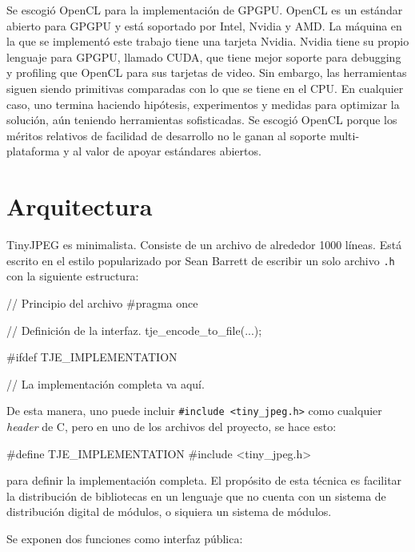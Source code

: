 Se escogió OpenCL para la implementación de GPGPU. OpenCL es un estándar abierto
para GPGPU y está soportado por Intel, Nvidia y AMD. La máquina en la que se
implementó este trabajo tiene una tarjeta Nvidia. Nvidia tiene su propio
lenguaje para GPGPU, llamado CUDA, que tiene mejor soporte para debugging y
profiling que OpenCL para sus tarjetas de video. Sin embargo, las herramientas
siguen siendo primitivas comparadas con lo que se tiene en el CPU. En cualquier
caso, uno termina haciendo hipótesis, experimentos y medidas para optimizar la
solución, aún teniendo herramientas sofisticadas. Se escogió OpenCL porque los
méritos relativos de facilidad de desarrollo no le ganan al soporte
multi-plataforma y al valor de apoyar estándares abiertos.

\section{Arquitectura}

TinyJPEG es minimalista. Consiste de un archivo de alrededor 1000 líneas. Está
escrito en el estilo popularizado por Sean Barrett de escribir un solo archivo
\verb+.h+ con la siguiente estructura:

\label{alg:stb}
\begin{code}[language=C][h]
    // Principio del archivo
    #pragma once

    // Definición de la interfaz.
    tje_encode_to_file(...);

    #ifdef TJE_IMPLEMENTATION

    // La implementación completa va aquí.
\end{code}

De esta manera, uno puede incluir \verb+#include <tiny_jpeg.h>+ como cualquier
\emph{header} de C, pero en uno de los archivos del proyecto, se hace esto:

\label{alg:stb_impl}
\begin{code}[language=C][h]
    #define TJE_IMPLEMENTATION
    #include <tiny_jpeg.h>
\end{code}

para definir la implementación completa. El propósito de esta técnica es
facilitar la distribución de bibliotecas en un lenguaje que no cuenta con un
sistema de distribución digital de módulos,
o siquiera un sistema de módulos.

Se exponen dos funciones como interfaz pública:

